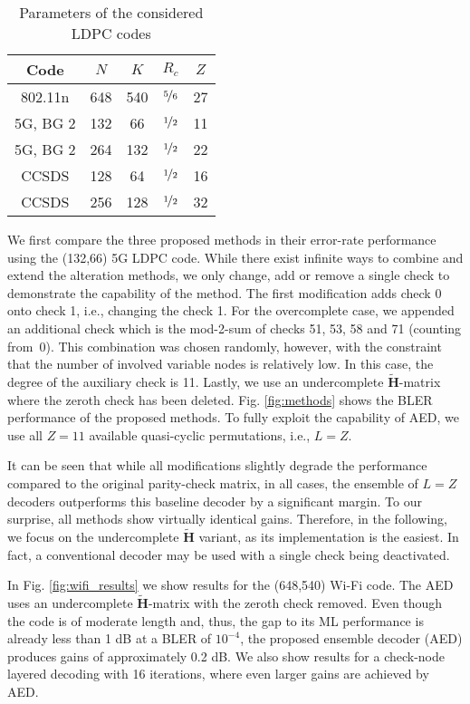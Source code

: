 \documentclass[conference]{IEEEtran}
\newcommand\new[1]{#1}
\begin{document}
\begin{NoHyper}
\begin{table}[h]
\caption{\footnotesize{Parameters of the considered LDPC codes}}
\centering\begin{tabular}{c|cccc}
    Code & $N$ & $K$ & $R_c$ & $Z$ \\
    \hline
    802.11n & 648 & 540 & $\nicefrac{5}{6}$ & 27 \\
    5G, BG 2 & 132 & 66 & $\nicefrac{1}{2}$ & 11 \\
    5G, BG 2 & 264 & 132 & $\nicefrac{1}{2}$ & 22 \\
    CCSDS & 128 & 64 & $\nicefrac{1}{2}$ & 16 \\
    CCSDS & 256 & 128 & $\nicefrac{1}{2}$ & 32 \\
\end{tabular}\label{tab:codes}
\end{table}

We first compare the three proposed methods in their error-rate performance using the (132,66) 5G LDPC code. While there exist infinite ways to combine and extend the alteration methods, we only change, add or remove a single check to demonstrate the capability of the method. 
The first modification adds check 0 onto check 1, i.e., changing the check 1. For the overcomplete case, we appended an additional check which is the mod-2-sum of checks 51, 53, 58 and 71 (counting from~0). \new{This combination was chosen randomly, however, with the constraint that the number of involved variable nodes is relatively low. In this case, the degree of the auxiliary check is 11.} Lastly, we use an undercomplete $\tilde{\mathbf{H}}$-matrix where the zeroth check has been deleted. 
\new{Fig. \ref{fig:methods} shows the \ac{BLER} performance of the proposed methods.} To fully exploit the capability of \ac{AED}, we use all $Z=11$ available quasi-cyclic permutations, i.e., $L=Z$.

It can be seen that while all modifications slightly degrade the performance compared to the original parity-check matrix, in all cases, the ensemble of $L=Z$ decoders outperforms this baseline decoder by a significant margin. To our surprise, all methods show virtually identical gains. Therefore, in the following, we focus on the undercomplete $\tilde{\mathbf{H}}$ variant, as its implementation is the easiest. In fact, a conventional decoder may be used with a single check being deactivated. 

In Fig. \ref{fig:wifi_results} we show results for the (648,540) Wi-Fi code. The \ac{AED} uses an undercomplete $\tilde{\mathbf{H}}$-matrix with the zeroth check removed. Even though the code is of moderate length and, thus, the gap to its \ac{ML} performance is already less than 1 dB at a \ac{BLER} of $10^{-4}$, the proposed ensemble decoder (AED) produces gains of approximately 0.2 dB. \new{We also show results for a check-node layered decoding with 16 iterations, where even larger gains are achieved by \ac{AED}.}


\end{NoHyper}
\end{document}
